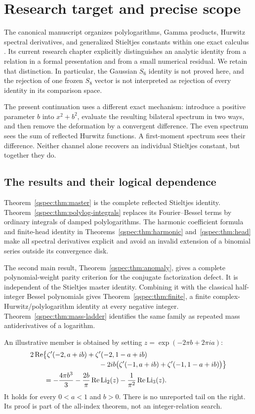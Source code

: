 \section{Research target and precise scope}\label{qspec:sec:context}

The canonical manuscript organizes polylogarithms, Gamma products, Hurwitz
spectral derivatives, and generalized Stieltjes constants within one exact
calculus \cite{repo}. Its current research chapter explicitly distinguishes
an analytic identity from a relation in a formal presentation and from a
small numerical residual. We retain that distinction. In particular, the
Gaussian $S_6$ identity is not proved here, and the rejection of one frozen
$S_8$ vector is not interpreted as rejection of every identity in its
comparison space.

The present continuation uses a different exact mechanism: introduce a
positive parameter $b$ into $x^2+b^2$, evaluate the resulting bilateral
spectrum in two ways, and then remove the deformation by a convergent
difference. The even spectrum sees the sum of reflected Hurwitz functions.
A first-moment spectrum sees their difference. Neither channel alone
recovers an individual Stieltjes constant, but together they do.

\subsection{The results and their logical dependence}
Theorem~\ref{qspec:thm:master} is the complete reflected Stieltjes identity.
Theorem~\ref{qspec:thm:polylog-integrals} replaces its Fourier--Bessel terms
by ordinary integrals of damped polylogarithms. The harmonic coefficient
formula and finite-head identity in Theorems~\ref{qspec:thm:harmonic}
and~\ref{qspec:thm:head} make all spectral derivatives explicit and avoid
an invalid extension of a binomial series outside its convergence disk.

The second main result, Theorem~\ref{qspec:thm:anomaly}, gives a complete
polynomial-weight parity criterion for the conjugate factorization defect.
It is independent of the Stieltjes master identity. Combining it with the
classical half-integer Bessel polynomials gives
Theorem~\ref{qspec:thm:finite}, a finite complex-Hurwitz/polylogarithm identity
at every negative integer. Theorem~\ref{qspec:thm:mass-ladder} identifies the
same family as repeated mass antiderivatives of a logarithm.

An illustrative member is obtained by setting
$z=\exp(-2\pi b+2\pi ia)$:
\begin{align}
&2\Rea\bigl\{\zeta'(-2,a+ib)+\zeta'(-2,1-a+ib)\notag\\[-2pt]
&\hspace{35mm}-2ib\bigl(\zeta'(-1,a+ib)+\zeta'(-1,1-a+ib)\bigr)\bigr\}\notag\\
&\qquad=-\frac{4\pi b^3}{3}
-\frac{2b}{\pi}\Rea\Li_2(z)-\frac1{\pi^2}\Rea\Li_3(z).
\label{qspec:eq:opening-example}
\end{align}
It holds for every $0<a<1$ and $b>0$. There is no unreported tail on the
right. Its proof is part of the all-index theorem, not an integer-relation
search.

